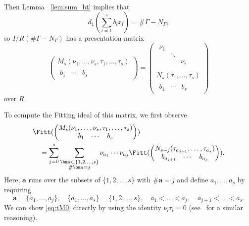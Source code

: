 Then Lemma ~\ref{lem:sum_bt} implies that
\[
d_1 \left(\sum_{l=1}^s b_l x_l \right) = \# \Gamma - N_{\Gamma},
\]
so $I/R(\# \Gamma - N_{\Gamma})$ has a presentation matrix
\[
\begin{pmatrix} M_s(\nu_1, \dots, \nu_s, \tau_1, \dots, \tau_s) \\ \begin{matrix} b_1 & \cdots & b_s \end{matrix} \end{pmatrix}
 = \begin{pmatrix} \begin{matrix} \nu_1 & & \\
& \ddots & \\
& & \nu_s \\
\end{matrix}\\
 N_s(\tau_1, \dots, \tau_s) \\
 \begin{matrix} b_1 & \cdots & b_s \end{matrix}
 \end{pmatrix}
\]
over $R$.

To  compute the Fitting ideal of this matrix,
we first observe
\begin{align}\label{eq:tM0}
& \Fitt(
	\begin{pmatrix} 
		M_s(\nu_1, \dots, \nu_s, \tau_1, \dots, \tau_s) \\ \begin{matrix} b_1 & \cdots & b_s \end{matrix}
	\end{pmatrix}
) \\
& \quad = \sum_{j = 0}^s \sum_{\substack{{\bm a} \subset \{1, 2, \dots, s\} \\ \# {\bm a} = j}} \nu_{a_1} \cdots \nu_{a_j} 
\Fitt(
	\begin{pmatrix} N_{s - j}(\tau_{a_{j + 1}}, \dots, \tau_{a_s}) \\ \begin{matrix} b_{a_{j+1}} & \cdots & b_{a_s} \end{matrix}
	\end{pmatrix}
).
\end{align}
Here, $\bm{a}$ runs over the subsets of $\{1, 2, \dots, s\}$ with $\# \bm{a} = j$ and define $a_1, \dots, a_s$ by requiring 
\[
\bm{a} = \{a_1, \dots, a_j\},
\quad \{a_1, \dots, a_s\} = \{1, 2, \dots, s\}, 
\quad a_1 < \dots < a_j, 
\quad a_{j + 1} < \dots < a_s.
\]
We can show \eqref{eq:tM0} directly by using the identity $\nu_l \tau_l = 0$ (see~\cite[Proposition 4.7]{AK21} for a similar reasoning).

